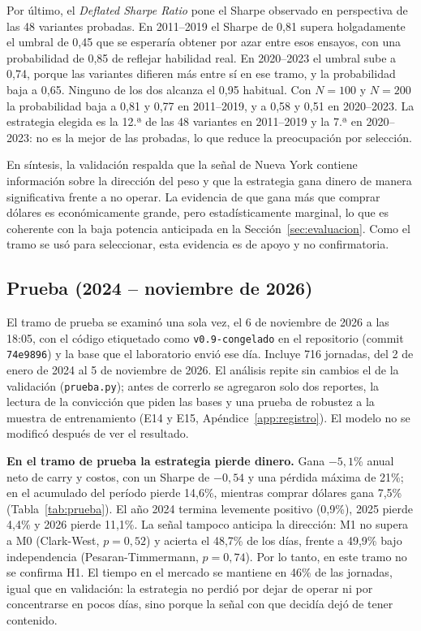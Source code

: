 \documentclass[11pt,a4paper]{article}
\begin{document}
Por último, el \emph{Deflated Sharpe Ratio} pone el Sharpe observado en perspectiva de las 48 variantes probadas. En 2011--2019 el Sharpe de 0,81 supera holgadamente el umbral de 0,45 que se esperaría obtener por azar entre esos ensayos, con una probabilidad de 0,85 de reflejar habilidad real. En 2020--2023 el umbral sube a 0,74, porque las variantes difieren más entre sí en ese tramo, y la probabilidad baja a 0,65. Ninguno de los dos alcanza el 0,95 habitual. Con \(N=100\) y \(N=200\) la probabilidad baja a 0,81 y 0,77 en 2011--2019, y a 0,58 y 0,51 en 2020--2023. La estrategia elegida es la 12.ª de las 48 variantes en 2011--2019 y la 7.ª en 2020--2023: no es la mejor de las probadas, lo que reduce la preocupación por selección.

En síntesis, la validación respalda que la señal de Nueva York contiene información sobre la dirección del peso y que la estrategia gana dinero de manera significativa frente a no operar. La evidencia de que gana más que comprar dólares es económicamente grande, pero estadísticamente marginal, lo que es coherente con la baja potencia anticipada en la Sección~\ref{sec:evaluacion}. Como el tramo se usó para seleccionar, esta evidencia es de apoyo y no confirmatoria.

\subsection{Prueba (2024 -- noviembre de 2026)}\label{sec:prueba}

El tramo de prueba se examinó una sola vez, el 6 de noviembre de 2026 a las 18:05, con el código etiquetado como \texttt{v0.9-congelado} en el repositorio (commit \texttt{74e9896}) y la base que el laboratorio envió ese día. Incluye 716 jornadas, del 2 de enero de 2024 al 5 de noviembre de 2026. El análisis repite sin cambios el de la validación (\texttt{prueba.py}); antes de correrlo se agregaron solo dos reportes, la lectura de la convicción que piden las bases y una prueba de robustez a la muestra de entrenamiento (E14 y E15, Apéndice~\ref{app:registro}). El modelo no se modificó después de ver el resultado.

\textbf{En el tramo de prueba la estrategia pierde dinero.} Gana $-5{,}1$\% anual neto de carry y costos, con un Sharpe de $-0{,}54$ y una pérdida máxima de 21\%; en el acumulado del período pierde 14,6\%, mientras comprar dólares gana 7,5\% (Tabla~\ref{tab:prueba}). El año 2024 termina levemente positivo (0,9\%), 2025 pierde 4,4\% y 2026 pierde 11,1\%. La señal tampoco anticipa la dirección: M1 no supera a M0 (Clark-West, \(p=0{,}52\)) y acierta el 48,7\% de los días, frente a 49,9\% bajo independencia (Pesaran-Timmermann, \(p=0{,}74\)). Por lo tanto, en este tramo no se confirma H1. El tiempo en el mercado se mantiene en 46\% de las jornadas, igual que en validación: la estrategia no perdió por dejar de operar ni por concentrarse en pocos días, sino porque la señal con que decidía dejó de tener contenido.
\end{document}

